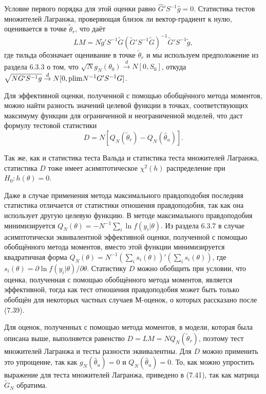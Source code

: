 Условие первого порядка для этой оценки равно $\hat{G}'S^{-1}\hat{g} = 0$. Статистика тестов множителей Лагранжа, проверяющая близок ли вектор-градиент к нулю, оценивается в точке $\tilde{\theta}_r$, что даёт
\begin{equation}
LM = N\tilde{g}'S^{-1}\tilde{G}(\tilde{G}'S^{-1}\tilde{G})^{-1}\tilde{G}'S^{-1}\tilde{g},
\end{equation}
где тильда обозначает оценивание в точке $\tilde{\theta}_r$ и мы используем предположение из раздела 6.3.3 о том, что $\sqrt{N}g_N(\theta_0) \stackrel{d}{\rightarrow} N[0, S_0]$, откуда $\sqrt{N G'S^{-1}g} \stackrel{d}{\rightarrow} N[0, \mathrm{plim } N^{-1}G'S^{-1}G]$.

Для эффективной оценки, полученной с помощью обобщённого метода моментов, можно найти разность значений целевой функции в точках, соответствующих максимуму функции для ограниченной и неограниченной моделей, что даст формулу тестовой статистики
\begin{equation}
D = N[Q_N(\tilde{\theta}_r) - Q_N(\hat{\theta}_u)].
\end{equation}

Так же, как и статистика теста Вальда и статистика теста множителей Лагранжа, статистика $D$ тоже имеет асимптотическое $\chi^2(h)$ распределение при $H_0: h(\theta) = 0$.

Даже в случае применения метода максимального правдоподобия последняя статистика отличается от статистики отношения правдоподобия, так как она использует другую целевую функцию. В методе максимального правдоподобия минимизируется $Q_N(\theta) = - N^{-1}\sum_i \ln f(y_i|\theta)$. Из раздела 6.3.7 в случае асимптотически эквивалентной эффективной оценки, полученной с помощью обобщённого метода моментов, вместо этой функции минимизируется квадратичная форма  $Q_N(\theta) = N^{-1}(\sum_i s_i(\theta))'(\sum_i s_i(\theta))$, где $s_i(\theta) = \partial{\ln f(y_i|\theta)}/\partial{\theta}$. Статистику $D$ можно обобщить при условии, что оценка, полученная с помощью обобщённого метода моментов, является эффективной, тогда как тест отношения правдоподобия может быть только обобщён для некоторых частных случаев М-оценок, о которых рассказано после (7.39).

Для оценок, полученных с помощью метода моментов, в модели, которая была описана выше, выполняется равенство $D = LM = NQ_N(\tilde{\theta}_r)$, поэтому тест множителей Лагранжа и тесты разности эквивалентны. Для $D$ можно применить это упрощение, так как $g_N(\hat{\theta}_u) = 0$ и $Q_N(\hat{\theta}_u) = 0$. То, как можно упростить выражение для теста множителей Лагранжа, приведено в (7.41), так как матрица $\tilde{G}_N$ обратима.

